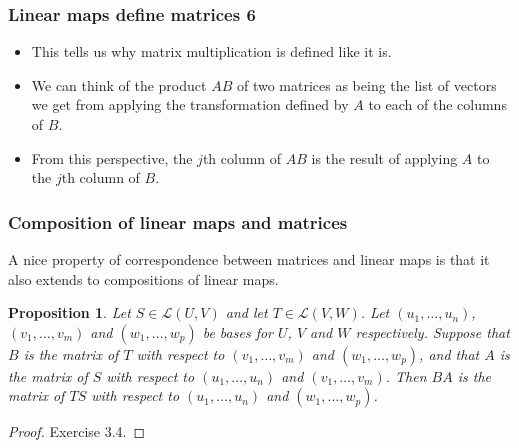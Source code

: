 \documentclass[handout]{beamer}
\newtheorem{proposition}[theorem]{Proposition}
\newcommand{\cL}{\mathcal{L}}
\begin{document}
\begin{frame}
\frametitle{Linear maps define matrices 6}
\begin{itemize}
\item This tells us why matrix multiplication is defined like it is. \vspace{0.7cm}
\item We can think of the product $AB$ of two matrices as being the list of vectors we get from applying the transformation defined by $A$ to each of the columns of $B$. \vspace{0.7cm}
\item From this perspective, the $j$th column of $AB$ is the result of applying $A$ to the $j$th column of $B$.
\end{itemize}
\end{frame}

\begin{frame}
\frametitle{Composition of linear maps and matrices}
A nice property of correspondence between matrices and linear maps is that it also extends to compositions of linear maps.

\begin{proposition}\label{P:LA3mult}
Let $S\in \cL(U,V)$ and let $T\in\cL(V,W)$. Let $(u_1,\ldots,u_n)$, $(v_1,\ldots,v_m)$ and $(w_1,\ldots, w_p)$ be bases for $U$, $V$ and $W$ respectively. Suppose that $B$ is the matrix of $T$ with respect to $(v_1,\ldots,v_m)$ and $(w_1,\ldots, w_p)$, and that $A$ is the matrix of $S$ with respect to $(u_1,\ldots,u_n)$ and $(v_1,\ldots,v_m)$. Then $BA$ is the matrix of $TS$ with respect to $(u_1,\ldots,u_n)$ and $(w_1,\ldots, w_p)$.
\end{proposition}  
\begin{proof}
Exercise 3.4. 
\end{proof}
\end{frame}
\end{document}
